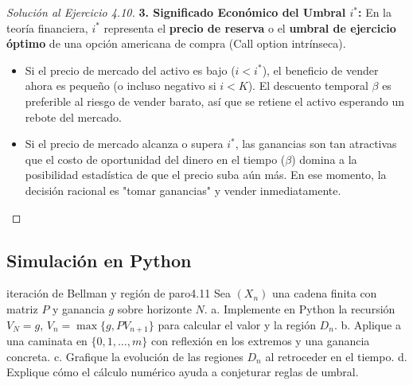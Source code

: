 \documentclass[10pt,a4paper]{article}
\begin{document}
\begin{proof}[Solución al Ejercicio 4.10]
    \textbf{3. Significado Económico del Umbral $i^*$:}
    En la teoría financiera, $i^*$ representa el \textbf{precio de reserva} o el \textbf{umbral de ejercicio óptimo} de una opción americana de compra (Call option intrínseca). 
    \begin{itemize}
        \item Si el precio de mercado del activo es bajo ($i < i^*$), el beneficio de vender ahora es pequeño (o incluso negativo si $i < K$). El descuento temporal $\beta$ es preferible al riesgo de vender barato, así que se retiene el activo esperando un rebote del mercado.
        \item Si el precio de mercado alcanza o supera $i^*$, las ganancias son tan atractivas que el costo de oportunidad del dinero en el tiempo ($\beta$) domina a la posibilidad estadística de que el precio suba aún más. En ese momento, la decisión racional es "tomar ganancias" y vender inmediatamente.
    \end{itemize}
\end{proof}

\newpage
\subsection{Simulación en Python}

\begin{ejercicio}{iteración de Bellman y región de paro}{4.11}
    Sea $(X_n)$ una cadena finita con matriz $P$ y ganancia $g$ sobre horizonte $N$.
    a. Implemente en Python la recursión $V_N = g$, $V_n = \max\{g, PV_{n+1}\}$ para calcular el valor y la región $D_n$.
    b. Aplique a una caminata en $\{0, 1, \dots, m\}$ con reflexión en los extremos y una ganancia concreta.
    c. Grafique la evolución de las regiones $D_n$ al retroceder en el tiempo.
    d. Explique cómo el cálculo numérico ayuda a conjeturar reglas de umbral.
\end{ejercicio}
\end{document}
